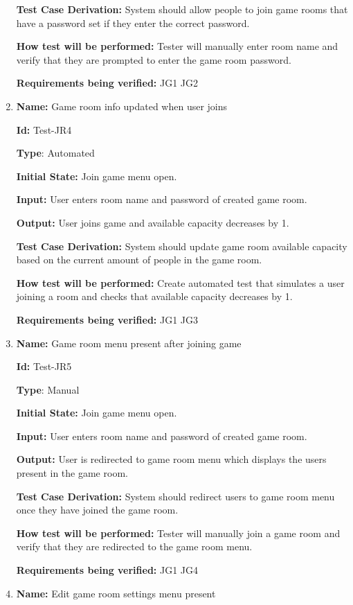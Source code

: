 \documentclass[12pt, titlepage]{article}
\begin{document}
\begin{enumerate}
\textbf{Test Case Derivation:} System should allow people to join game rooms that have a password set if they enter the correct password. 

\textbf{How test will be performed:} Tester will manually enter room name and verify that they are prompted to enter the game room password.

\textbf{Requirements being verified: }JG1 JG2

\item{\textbf{Name:} Game room info updated when user joins}

\textbf{Id:} Test-JR4

\textbf{Type}: Automated

\textbf{Initial State:} Join game menu open. 

\textbf{Input:} User enters room name and password of created game room.

\textbf{Output:} User joins game and available capacity decreases by 1.

\textbf{Test Case Derivation:} System should update game room available capacity based on the current amount of people in the game room.

\textbf{How test will be performed:} Create automated test that simulates a user joining a room and checks that available capacity decreases by 1.

\textbf{Requirements being verified: }JG1 JG3

\item{\textbf{Name:} Game room menu present after joining game}

\textbf{Id:} Test-JR5

\textbf{Type}: Manual

\textbf{Initial State:} Join game menu open.

\textbf{Input:} User enters room name and password of created game room. 

\textbf{Output:} User is redirected to game room menu which displays the users present in the game room.

\textbf{Test Case Derivation:} System should redirect users to game room menu once they have joined the game room.

\textbf{How test will be performed:} Tester will manually join a game room and verify that they are redirected to the game room menu.

\textbf{Requirements being verified: }JG1 JG4

\item{\textbf{Name:} Edit game room settings menu present}


\end{enumerate}
\end{document}
